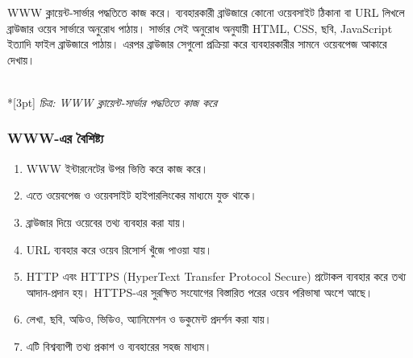 WWW ক্লায়েন্ট-সার্ভার পদ্ধতিতে কাজ করে। ব্যবহারকারী ব্রাউজারে কোনো ওয়েবসাইট ঠিকানা বা URL লিখলে ব্রাউজার ওয়েব সার্ভারে অনুরোধ পাঠায়। সার্ভার সেই অনুরোধ অনুযায়ী HTML, CSS, ছবি, JavaScript ইত্যাদি ফাইল ব্রাউজারে পাঠায়। এরপর ব্রাউজার সেগুলো প্রক্রিয়া করে ব্যবহারকারীর সামনে ওয়েবপেজ আকারে দেখায়।

\begin{center}
\\*[3pt]
\textit{চিত্র: WWW ক্লায়েন্ট-সার্ভার পদ্ধতিতে কাজ করে}
\end{center}

\subsubsection{WWW-এর বৈশিষ্ট্য}

\begin{enumerate}
\item WWW ইন্টারনেটের উপর ভিত্তি করে কাজ করে।
\item এতে ওয়েবপেজ ও ওয়েবসাইট হাইপারলিংকের মাধ্যমে যুক্ত থাকে।
\item ব্রাউজার দিয়ে ওয়েবের তথ্য ব্যবহার করা যায়।
\item URL ব্যবহার করে ওয়েব রিসোর্স খুঁজে পাওয়া যায়।
\item HTTP এবং HTTPS (HyperText Transfer Protocol Secure) প্রটোকল ব্যবহার করে তথ্য আদান-প্রদান হয়। HTTPS-এর সুরক্ষিত সংযোগের বিস্তারিত পরের ওয়েব পরিভাষা অংশে আছে।
\item লেখা, ছবি, অডিও, ভিডিও, অ্যানিমেশন ও ডকুমেন্ট প্রদর্শন করা যায়।
\item এটি বিশ্বব্যাপী তথ্য প্রকাশ ও ব্যবহারের সহজ মাধ্যম।
\end{enumerate}

